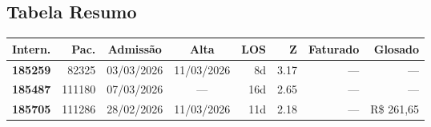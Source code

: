 \documentclass[a4paper,10pt]{article}
\begin{document}
\subsection{Tabela Resumo}
\begin{center}
\begin{longtable}{>{\scriptsize}r>{\scriptsize}r>{\scriptsize}c>{\scriptsize}c>{\scriptsize}r>{\scriptsize}r>{\scriptsize}r>{\scriptsize}r}
\toprule
\textbf{Intern.} & \textbf{Pac.} & \textbf{Admiss\~{a}o} & \textbf{Alta} & \textbf{LOS} & \textbf{Z} & \textbf{Faturado} & \textbf{Glosado} \\
\midrule
\endhead
\bottomrule
\endfoot

\textcolor{anomorange}{\textbf{185259}} & 82325 & 03/03/2026 & 11/03/2026 & 8d & \textcolor{anomorange}{3.17} & --- & --- \\

\textcolor{anomyellow}{\textbf{185487}} & 111180 & 07/03/2026 & — & 16d & \textcolor{anomyellow}{2.65} & --- & --- \\

\textcolor{anomyellow}{\textbf{185705}} & 111286 & 28/02/2026 & 11/03/2026 & 11d & \textcolor{anomyellow}{2.18} & --- & \textcolor{anomred}{R\$ 261,65} \\

\end{longtable}\end{center}
\end{document}
